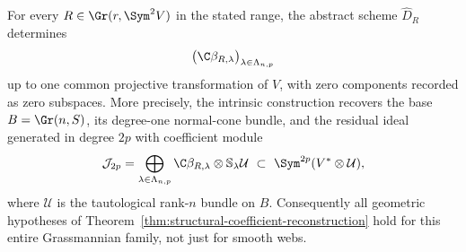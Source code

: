 \begin{theorem}
\label{thm:automatic-quadratic-coefficients}
For every \(R\in\Gr(r,\Sym^2V)\) in the stated range, the
abstract scheme \(\widehat D_R\) determines
\[
       \bigl(\C\beta_{R,\lambda}\bigr)_{\lambda\in\Lambda_{n,p}}
\]
up to one common projective transformation of \(V\), with zero
components recorded as zero subspaces.  More precisely, the intrinsic
construction recovers the base \(B=\Gr(n,S)\), its degree-one
normal-cone bundle, and the residual ideal generated in degree \(2p\)
with coefficient module
\begin{equation}\label{eq:automatic-residual-module}
 \mathcal J_{2p}=
 \bigoplus_{\lambda\in\Lambda_{n,p}}
       \C\beta_{R,\lambda}\otimes\mathbb S_\lambda\mathcal U
 \ \subset\ \Sym^{2p}(V^*\otimes\mathcal U),
\end{equation}
where \(\mathcal U\) is the tautological rank-\(n\) bundle on
\(B\).  Consequently all geometric hypotheses of
Theorem~\ref{thm:structural-coefficient-reconstruction} hold for this
entire Grassmannian family, not just for smooth webs.
\end{theorem}
